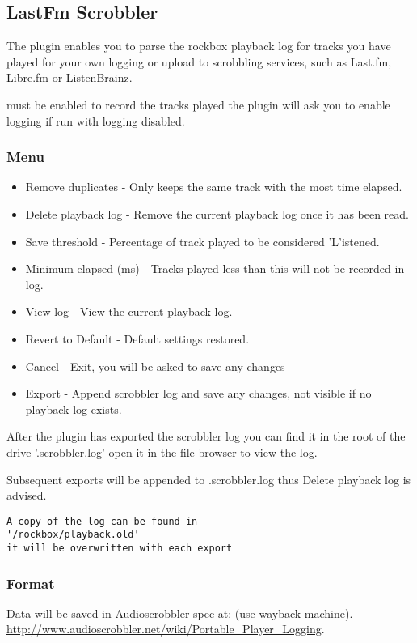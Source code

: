 \subsection{LastFm Scrobbler}
The  plugin enables you to parse the rockbox
playback log for tracks you have played for your own logging or upload
to scrobbling services, such as Last.fm, Libre.fm or ListenBrainz.

 must be enabled to record the tracks played
the plugin will ask you to enable logging if run with logging disabled.

\subsubsection{Menu}
\begin{itemize}
\item Remove duplicates - Only keeps the same track with the most time elapsed.
\item Delete playback log - Remove the current playback log once it has been read.
\item Save threshold - Percentage of track played to be considered 'L'istened.
\item Minimum elapsed (ms) - Tracks played less than this will not be recorded in log.
\item View log - View the current playback log.
\item Revert to Default - Default settings restored.
\item Cancel - Exit, you will be asked to save any changes
\item Export - Append scrobbler log and save any changes, not visible if no playback log exists.
\end{itemize}

After the plugin has exported the scrobbler log you can find it in the root
of the drive '.scrobbler.log' open it in the file browser to view the log.

Subsequent exports will be appended to .scrobbler.log thus Delete playback log is advised.

\begin{verbatim}
A copy of the log can be found in
'/rockbox/playback.old'
it will be overwritten with each export
\end{verbatim}

\subsubsection{Format}
Data will be saved in Audioscrobbler spec at: (use wayback machine).
\url{http://www.audioscrobbler.net/wiki/Portable_Player_Logging}.

